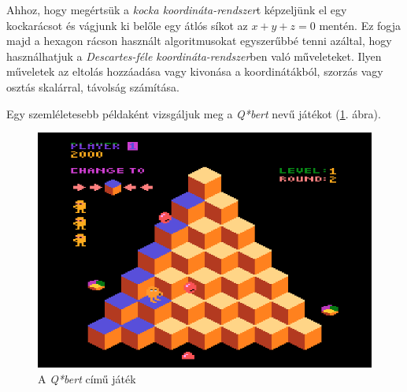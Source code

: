 Ahhoz, hogy megértsük a \textit{kocka koordináta-rendszer}t képzeljünk el egy kockarácsot és vágjunk ki belőle egy átlós síkot az $x + y + z = 0$ mentén. Ez fogja majd a hexagon rácson használt algoritmusokat egyszerűbbé tenni azáltal, hogy használhatjuk a \textit{Descartes-féle koordináta-rendszer}ben való műveleteket. Ilyen műveletek az eltolás hozzáadása vagy kivonása a  koordinátákból, szorzás vagy osztás skalárral, távolság számítása.

Egy szemléletesebb példaként vizsgáljuk meg a \textit{Q*bert} nevű játékot (\ref{fig:Qbert}. ábra).

\begin{figure}[h!]
\centering
\includegraphics[scale=0.5]{kepek/Qbert.png}
\caption{A \textit{Q*bert} című játék}
\label{fig:Qbert}
\end{figure}


